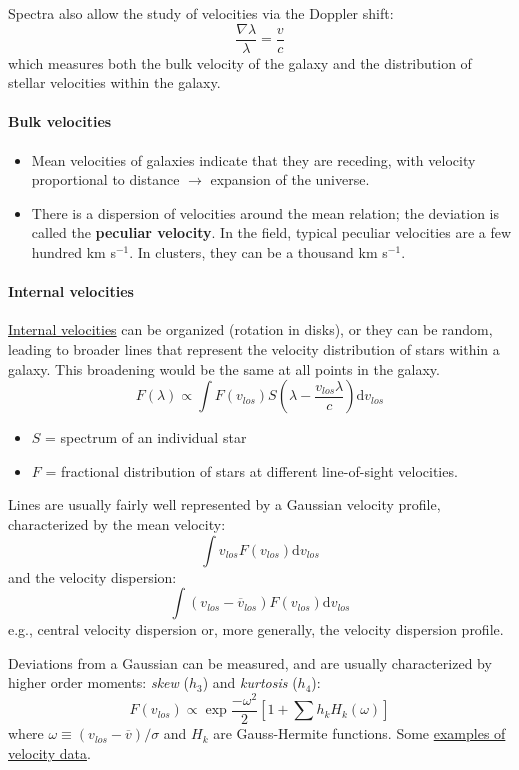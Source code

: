 \documentclass{article}
\newcommand{\mynotes}[1]{\textcolor{cadmiumorange}{#1}}
\begin{document}
Spectra also allow the study of velocities via the Doppler shift:
\[
    \frac{\nabla\lambda}{\lambda} = \frac{v}{c}
    \]
which measures both the bulk velocity of the galaxy and the
distribution of stellar velocities within the galaxy.
\paragraph{Bulk velocities}
\begin{itemize}
    \item Mean velocities of galaxies indicate that they are receding, with
        velocity proportional to distance $\rightarrow$ expansion of the
        universe.
    \item There is a dispersion of velocities around the mean relation; the
        deviation is called the \textbf{peculiar velocity}.  In the field,
        typical peculiar velocities are a few hundred km s$^{-1}$.  In
        clusters, they can be a thousand km s$^{-1}$.
\end{itemize}
\paragraph{Internal velocities}
\href{http://astronomy.nmsu.edu/holtz/a555/resources/intvel.gif}
{Internal velocities} can be organized (rotation in disks), or they can
be random, leading to broader lines that represent the
velocity distribution of stars within a galaxy.
\mynotes{This broadening would be the same at all points in the galaxy.}
\[
    F(\lambda) \propto \int{F(v_{los})S\left(\lambda-\frac{v_{los}\lambda}{c}
    \right)\mathrm{d}v_{los} }
    \]

\begin{itemize}
    \item $S$ = spectrum of an individual star
    \item $F$ = fractional distribution of stars at
        different line-of-sight velocities.
\end{itemize}
Lines are usually fairly well represented
by a Gaussian velocity profile, characterized by the mean velocity:
\[
    \int{v_{los}F(v_{los})\mathrm{d}v_{los}}
    \]
and the velocity dispersion:
\[
    \int{(v_{los}-\overline{v}_{los})F(v_{los})\mathrm{d}v_{los}}
    \]
e.g., central velocity dispersion or, more generally, the velocity
dispersion profile.

Deviations from a Gaussian can be measured, and are usually characterized
by higher order moments: \textit{skew} ($h_{3}$) and \textit{kurtosis}
($h_{4}$):
\[
    F(v_{los}) \propto \exp\frac{-\omega^{2}}{2}\left[
        1 + \sum{h_{k}H_{k}(\omega)}\right]
\]
where $\omega \equiv (v_{los}-\overline{v})/\sigma$ and
$H_{k}$ are Gauss-Hermite functions.
Some
\href{http://astronomy.nmsu.edu/holtz/a555/resources/examplesh3h4.gif}
{examples of velocity data}.
\end{document}
